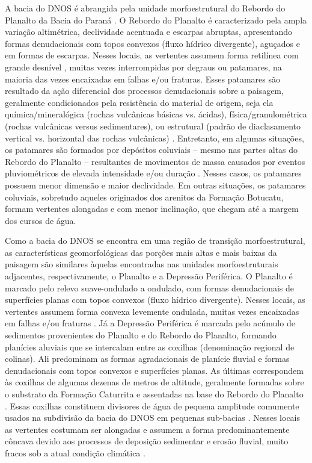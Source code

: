 A bacia do DNOS é abrangida pela unidade morfoestrutural do Rebordo do Planalto da Bacia do Paraná 
\cite{NascimentoEtAl2010}. O Rebordo do Planalto é caracterizado pela ampla variação altimétrica, declividade 
acentuada e escarpas abruptas, apresentando formas denudacionais com topos convexos (fluxo hídrico 
divergente), aguçados e em formas de escarpas. Nesses locais, as vertentes assumem forma retilínea com grande 
desnível \cite{NascimentoEtAl2010}, muitas vezes interrompidas por degraus ou patamares, na maioria das vezes 
encaixadas em falhas e/ou fraturas. Esses patamares são resultado da ação diferencial dos processos 
denudacionais sobre a paisagem, geralmente condicionados pela resistência do material de origem, seja ela 
química/mineralógica (rochas vulcânicas básicas vs. ácidas), física/granulométrica (rochas vulcânicas versus 
sedimentares), ou estrutural (padrão de diaclasamento vertical vs. horizontal das rochas vulcânicas) 
\cite{Holtz2003, Pedron2007, StreckEtAl2008}. Entretanto, em algumas situações, os patamares são formados por 
depósitos coluviais -- mesmo nas partes altas do Rebordo do Planalto -- resultantes de movimentos de massa 
causados por eventos pluviométricos de elevada intensidade e/ou duração \cite{PinheiroEtAl2004, 
PaisaniEtAl2010}. Nesses casos, os patamares possuem menor dimensão e maior declividade. Em outras situações, 
os patamares coluviais, sobretudo aqueles originados dos arenitos da Formação Botucatu, formam 
vertentes alongadas e com menor inclinação, que chegam até a margem dos cursos de água.

Como a bacia do DNOS se encontra em uma região de transição morfoestrutural, as características 
geomorfológicas das porções mais altas e mais baixas da paisagem são similares àquelas encontradas nas 
unidades morfoestruturais adjacentes, respectivamente, o Planalto e a Depressão Periférica. O Planalto é 
marcado pelo relevo suave-ondulado a ondulado, com formas denudacionais de superfícies planas com topos 
convexos (fluxo hídrico divergente). Nesses locais, as vertentes assumem forma convexa levemente ondulada, 
muitas vezes encaixadas em falhas e/ou fraturas \cite{NascimentoEtAl2010}. Já a Depressão Periférica é marcada 
pelo acúmulo de sedimentos provenientes do Planalto e do Rebordo do Planalto, formando planícies aluviais que 
se intercalam entre as coxilhas (denominação regional de colinas). Ali predominam as formas agradacionais de 
planície fluvial e formas denudacionais com topos convexos e superfícies planas. As últimas correspondem às 
coxilhas de algumas dezenas de metros de altitude, geralmente formadas sobre o substrato da Formação Caturrita 
e assentadas na base do Rebordo do Planalto \cite{GasparettoEtAl1988}. Essas coxilhas constituem divisores de 
água de pequena amplitude comumente usados na subdivisão da bacia do DNOS em pequenas sub-bacias 
\cite{Marins2004, Sartori2009}. Nesses locais as vertentes costumam ser alongadas e assumem a forma 
predominantemente côncava devido aos processos de deposição sedimentar e erosão fluvial, muito fracos sob a 
atual condição climática \cite{NascimentoEtAl2010, WerlangEtAl2010}.


